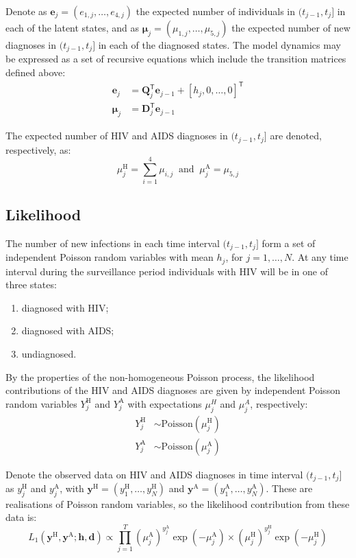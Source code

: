 Denote as $\bm{e}_j = (e_{1,j},\dots,e_{4,j})$ the expected number of individuals in $(t_{j-1},t_j]$ in each of the latent states, and as $\bm{\mu}_j = (\mu_{1,j},\dots,\mu_{5,j})$ the expected number of new diagnoses in $(t_{j-1},t_j]$ in each of the diagnosed states. The model dynamics may be expressed as a set of recursive equations which include the transition matrices defined above:
%
\begin{align*}
  \bm{e}_j   & = \mathbf{Q}_j^\mathsf{T} \bm{e}_{j-1} + {[h_j, 0, \ldots,0]}^\mathsf{T} \\
  \bm{\mu}_j & = \mathbf{D}_j^\mathsf{T} \bm{e}_{j-1}
\end{align*}

The expected number of HIV and AIDS diagnoses in $(t_{j-1},t_j]$ are denoted, respectively, as:
%
\[
  \mu_j^\text{H} = \sum_{i=1}^4{\mu_{i,j}} \: \text{ and } \:
  \mu_j^\text{A} = \mu_{5,j}
\]

\subsection{Likelihood}

The number of new infections in each time interval $(t_{j-1},t_j]$ form a set of independent Poisson random variables with mean $h_j$, for $j = 1,\ldots,N$. At any time interval during the surveillance period individuals with HIV will be in one of three states:
%
\begin{enumerate}
  \item diagnosed with HIV;
  \item diagnosed with AIDS;
  \item undiagnosed.
\end{enumerate}

By the properties of the non-homogeneous Poisson process, the likelihood contributions of the HIV and AIDS diagnoses are given by independent Poisson random variables $Y^\text{H}_j$ and $Y^\text{A}_j$ with expectations $\mu_j^H$ and $\mu_j^A$, respectively:
%
\begin{align*}
  Y^\text{H}_j & \sim \text{Poisson}(\mu_j^\text{H}) \\
  Y^\text{A}_j & \sim \text{Poisson}(\mu_j^\text{A})
\end{align*}

Denote the observed data on HIV and AIDS diagnoses in time interval $(t_{j-1},t_j]$ as $y_j^\text{H}$ and $y_j^\text{A}$, with $\bm{y}^\text{H} = (y_1^\text{H}, \ldots, y_N^\text{H})$ and $\bm{y}^\text{A} = (y_1^\text{A}, \ldots, y_N^\text{A})$. These are realisations of Poisson random variables, so the likelihood contribution from these data is:
%
\[
  L_1(\bm{y}^\text{H}, \bm{y}^\text{A};\bm{h},\bm{d}) \propto \prod_{j=1}^T {(\mu_j^\text{A})}^{y^\text{A}_j}\exp(-\mu_j^\text{A})\times{(\mu_j^\text{H})}^{y^\text{H}_j}\exp(-\mu_j^\text{H})
\]

